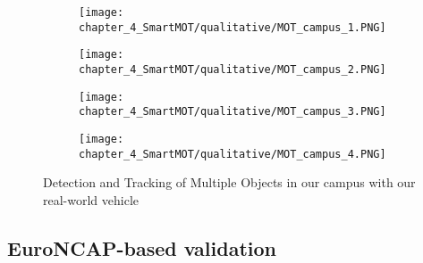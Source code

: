 \begin{figure}[h]
	\centering
	\begin{subfigure}{0.43\textwidth}
		\captionsetup{justification=centering}
		\texttt{[image: chapter\_4\_SmartMOT/qualitative/MOT\_campus\_1.PNG]}
		\caption{}
	\end{subfigure}
	\hfill
	\begin{subfigure}{0.43\textwidth}
		\captionsetup{justification=centering}
		\texttt{[image: chapter\_4\_SmartMOT/qualitative/MOT\_campus\_2.PNG]}
		\caption{}
	\end{subfigure}
	\hfill
	\begin{subfigure}{0.43\textwidth}
		\captionsetup{justification=centering}
		\texttt{[image: chapter\_4\_SmartMOT/qualitative/MOT\_campus\_3.PNG]}
		\caption{}
	\end{subfigure}
	\hfill
	\begin{subfigure}{0.43\textwidth}
		\captionsetup{justification=centering}
		\texttt{[image: chapter\_4\_SmartMOT/qualitative/MOT\_campus\_4.PNG]}
		\caption{}
	\end{subfigure}
	\caption{Detection and Tracking of Multiple Objects in our campus with our real-world vehicle}
	\label{fig:chapter_4_SmartMOT/MOT_campus}
\end{figure}

\subsection{EuroNCAP-based validation}
\label{subsec:4_euroncap}


